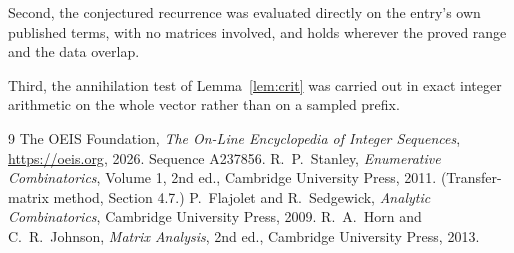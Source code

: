 \documentclass[11pt,a4paper]{article}
\theoremstyle{plain}
\theoremstyle{definition}
\begin{document}
Second, the conjectured recurrence was evaluated directly on the entry's own published terms,
with no matrices involved, and holds wherever the proved range and the data overlap.

Third, the annihilation test of Lemma~\ref{lem:crit} was carried out in exact integer
arithmetic on the whole vector rather than on a sampled prefix.

\begin{thebibliography}{9}
 The OEIS Foundation, \emph{The On-Line Encyclopedia of Integer
Sequences}, \url{https://oeis.org}, 2026. Sequence A237856.
 R.~P.~Stanley, \emph{Enumerative Combinatorics}, Volume 1, 2nd ed.,
Cambridge University Press, 2011. (Transfer-matrix method, Section 4.7.)
 P.~Flajolet and R.~Sedgewick, \emph{Analytic Combinatorics}, Cambridge
University Press, 2009.
 R.~A.~Horn and C.~R.~Johnson, \emph{Matrix Analysis}, 2nd ed., Cambridge
University Press, 2013.
\end{thebibliography}
\end{document}
